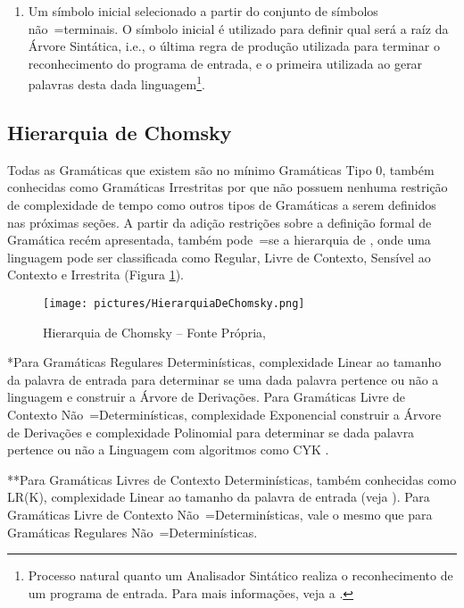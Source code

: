 {\begin{enumerate}
        \item Um símbolo inicial selecionado a partir do conjunto de símbolos não~=terminais.
        O símbolo inicial é utilizado para definir qual será a raíz da Árvore Sintática,
        i.e.,
        o última regra de produção utilizada para terminar o reconhecimento do programa de entrada,
        e o primeira  utilizada ao gerar palavras desta dada linguagem\footnote{
        Processo natural quanto um Analisador Sintático realiza o reconhecimento de um programa de entrada.
        Para mais informações,
        veja a .
        }.
    \end{enumerate}


\subsection{Hierarquia de Chomsky}

    Todas as Gramáticas que existem são no mínimo Gramáticas Tipo 0,
    também conhecidas como Gramáticas Irrestritas por que não possuem nenhuma restrição de complexidade de tempo como outros tipos de Gramáticas a serem definidos nas próximas seções{}.
    A partir da adição restrições sobre a definição formal de Gramática recém apresentada,
    também pode~=se  a hierarquia de ,
    onde uma linguagem pode ser classificada como Regular,
    Livre de Contexto,
    Sensível ao Contexto e
    Irrestrita (Figura \ref{fig:pictures/HierarquiaDeChomsky.png}).
    \begin{figure}[h]
    \centering
    \texttt{[image: pictures/HierarquiaDeChomsky.png]}
    \caption[Hierarquia de Chomsky]{Hierarquia de Chomsky -- Fonte Própria,
    }
    \label{fig:pictures/HierarquiaDeChomsky.png}
    \end{figure}

    *Para Gramáticas Regulares Determinísticas,
    complexidade Linear ao tamanho da palavra de entrada para determinar se uma dada palavra pertence ou
    não a linguagem e
    construir a Árvore de Derivações.
    Para Gramáticas Livre de Contexto Não~=Determinísticas,
    complexidade Exponencial construir a Árvore de Derivações e
    complexidade Polinomial para determinar se dada palavra pertence ou
    não a Linguagem com algoritmos como CYK \cite{hopcroftBook}.

    **Para Gramáticas Livres de Contexto Determinísticas,
    também conhecidas como LR(K),
    complexidade Linear ao tamanho da palavra de entrada (veja ).
    Para Gramáticas Livre de Contexto Não~=Determinísticas,
    vale o mesmo que para Gramáticas Regulares Não~=Determinísticas.

}
